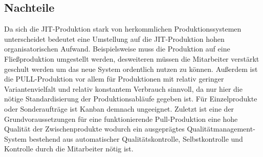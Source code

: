 \documentclass[00_ToyotaProduktionssystem.tex]{subfiles}
\begin{document}
\subsection{Nachteile}
Da sich die JIT-Produktion stark von herkommlichen Produktionssystemen unterscheidet bedeutet eine Umstellung auf die JIT-Produktion hohen organisatorischen Aufwand. Beispielsweise muss die Produktion auf eine Fließproduktion umgestellt werden, desweiteren müssen die Mitarbeiter verstärkt geschult werden um das neue System ordentlich nutzen zu können. Außerdem ist die PULL-Produktion vor allem für Produktionen mit relativ geringer Variantenvielfalt und relativ konstantem Verbrauch sinnvoll, da nur hier die nötige Standardisierung der Produktionsabläufe gegeben ist. Für Einzelprodukte oder Sonderaufträge ist Kanban demnach ungeeignet. Zuletzt ist eine der Grundvoraussetzungen für eine funktionierende Pull-Produktion eine hohe Qualität der Zwischenprodukte wodurch ein ausgeprägtes Qualitätmanagement-System bestehend aus automatischer Qualitätskontrolle, Selbstkontrolle und Kontrolle durch die Mitarbeiter nötig ist.
\end{document}
